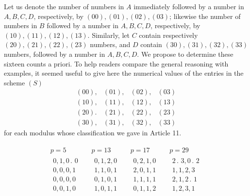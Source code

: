 Let us denote the number of numbers in $A$ immediately followed by a number in $A,B,C,D$, respectively, by $(00),(01),(02),(03)$; likewise the number of numbers in $B$ followed by a number in $A,B,C,D$, respectively, by $(10),(11),(12),(13)$. Similarly, let $C$ contain respectively $(20),(21),(22),(23)$ numbers, and $D$ contain $(30),(31),(32),(33)$ numbers, followed by a number in $A,B,C,D$. We propose to determine these sixteen counts a priori. To help readers compare the general reasoning with examples, it seemed useful to give here the numerical values of the entries in the scheme $(S)$
\[
\begin{array}{llll}
(00),&(01),&(02),&(03)\\
(10),&(11),&(12),&(13)\\
(20).&(21),&(22),&(23)\\
(30),&(31),&(32),&(33)
\end{array}
\]
for each modulus whose classification we gave in Article 11.

\[
\begin{array}{c|c|c|c}
\begin{gathered}
p=5\\[3pt]
\begin{array}{l}
0,1,0\mathpunct{.}\,0\\
0,0,0,1\\
0,0,0,0\\
0,0,1,0
\end{array}
\end{gathered}&
\begin{gathered}
p=13\\[3pt]
\begin{array}{l}
0,1,2,0\\
1,1,0,1\\
0,1,0,1\\
1,0,1,1
\end{array}
\end{gathered}&
\begin{gathered}
p=17\\[3pt]
\begin{array}{l}
0,2,1,0\\
2,0,1,1\\
1,1,1,1\\
0,1,1,2
\end{array}
\end{gathered}&
\begin{gathered}
p=29\\[3pt]
\begin{array}{l}
2\mathpunct{.}\,3,0\mathpunct{.}\,2\\
1,1,2,3\\
2,1,2\mathpunct{.}\,1\\
1,2,3,1
\end{array}
\end{gathered}
\end{array}
\]

